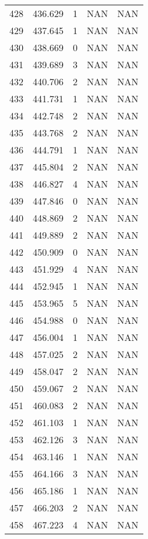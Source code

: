 \documentclass{article}
\begin{document}
\begin{longtable}{@{}lllll@{}}
				428 & 436.629 & 1     & NAN   & NAN   \\
				429 & 437.645 & 1     & NAN   & NAN   \\
				430 & 438.669 & 0     & NAN   & NAN   \\
				431 & 439.689 & 3     & NAN   & NAN   \\
				432 & 440.706 & 2     & NAN   & NAN   \\
				433 & 441.731 & 1     & NAN   & NAN   \\
				434 & 442.748 & 2     & NAN   & NAN   \\
				435 & 443.768 & 2     & NAN   & NAN   \\
				436 & 444.791 & 1     & NAN   & NAN   \\
				437 & 445.804 & 2     & NAN   & NAN   \\
				438 & 446.827 & 4     & NAN   & NAN   \\
				439 & 447.846 & 0     & NAN   & NAN   \\
				440 & 448.869 & 2     & NAN   & NAN   \\
				441 & 449.889 & 2     & NAN   & NAN   \\
				442 & 450.909 & 0     & NAN   & NAN   \\
				443 & 451.929 & 4     & NAN   & NAN   \\
				444 & 452.945 & 1     & NAN   & NAN   \\
				445 & 453.965 & 5     & NAN   & NAN   \\
				446 & 454.988 & 0     & NAN   & NAN   \\
				447 & 456.004 & 1     & NAN   & NAN   \\
				448 & 457.025 & 2     & NAN   & NAN   \\
				449 & 458.047 & 2     & NAN   & NAN   \\
				450 & 459.067 & 2     & NAN   & NAN   \\
				451 & 460.083 & 2     & NAN   & NAN   \\
				452 & 461.103 & 1     & NAN   & NAN   \\
				453 & 462.126 & 3     & NAN   & NAN   \\
				454 & 463.146 & 1     & NAN   & NAN   \\
				455 & 464.166 & 3     & NAN   & NAN   \\
				456 & 465.186 & 1     & NAN   & NAN   \\
				457 & 466.203 & 2     & NAN   & NAN   \\
				458 & 467.223 & 4     & NAN   & NAN   \\

\end{longtable}
\end{document}
